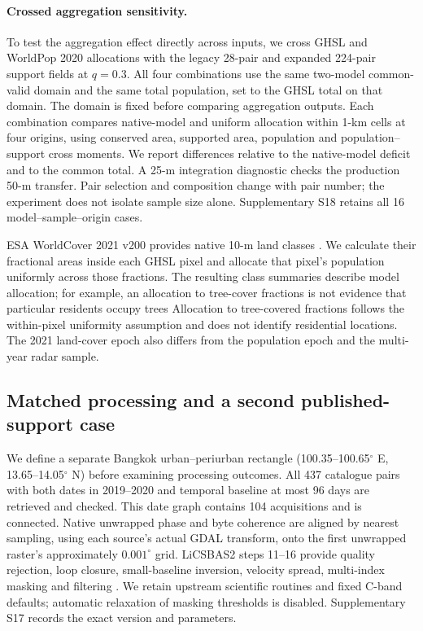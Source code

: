 \documentclass[pdflatex,sn-nature]{sn-jnl}
\providecommand{\DIFadd}[1]{{\protect\color{blue} \sf #1}} %
\providecommand{\DIFdel}[1]{{\protect\color{red} \scriptsize #1}} %
\providecommand{\DIFaddbegin}{} %
\providecommand{\DIFaddend}{} %
\providecommand{\DIFdelbegin}{} %
\providecommand{\DIFdelend}{} %
\begin{document}
\paragraph{Crossed aggregation sensitivity.} To test the aggregation effect directly across inputs, we cross GHSL and WorldPop 2020 allocations with the legacy 28-pair and expanded 224-pair support fields at $q=0.3$. All four combinations use the same two-model common-valid domain and the same total population, set to the GHSL total on that domain. The domain is fixed before comparing aggregation outputs. Each combination compares native-model and uniform allocation within 1-km cells at four origins, using conserved area, supported area, population and population--support cross moments. We report differences relative to the native-model deficit and to the common total. A 25-m integration diagnostic checks the production 50-m transfer. Pair selection and composition change with pair number; the experiment does not isolate sample size alone. Supplementary S18 retains all 16 model--sample--origin cases.

ESA WorldCover 2021 v200 provides native 10-m land classes \citep{worldcover2021}. We calculate their fractional areas inside each GHSL pixel and allocate that pixel's population uniformly across those fractions. \DIFdelbegin \DIFdel{The resulting class summaries describe model allocation; for example, an allocation to tree-cover fractions is not evidence that particular residents occupy trees}\DIFdelend \DIFaddbegin \DIFadd{Allocation to tree-covered fractions follows the within-pixel uniformity assumption and does not identify residential locations}\DIFaddend . The 2021 land-cover epoch also differs from the population epoch and the multi-year radar sample.

\subsection{Matched processing and a second published-support case}
We define a separate Bangkok urban--periurban rectangle (100.35--100.65$^\circ$ E, 13.65--14.05$^\circ$ N) before examining processing outcomes. All 437 catalogue pairs with both dates in 2019--2020 and temporal baseline at most 96 days are retrieved and checked. This date graph contains 104 acquisitions and is connected. Native unwrapped phase and byte coherence are aligned by nearest sampling, using each source's actual GDAL transform, onto the first unwrapped raster's approximately $0.001^\circ$ grid. LiCSBAS2 steps 11--16 provide quality rejection, loop closure, small-baseline inversion, velocity spread, multi-index masking and filtering \citep{morishita2020licsbas,licsbas2}. We retain upstream scientific routines and fixed C-band defaults; automatic relaxation of masking thresholds is disabled. Supplementary S17 records the exact version and parameters.
\end{document}

